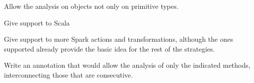 
Allow the analysis on objects not only on primitive types.

Give support to Scala

Give support to more Spark actions and transformations, although the ones supported already provide the basic idea for the rest of the strategies.

Write an annotation that would allow the analysis of only the indicated methods, interconnecting those that are consecutive.

